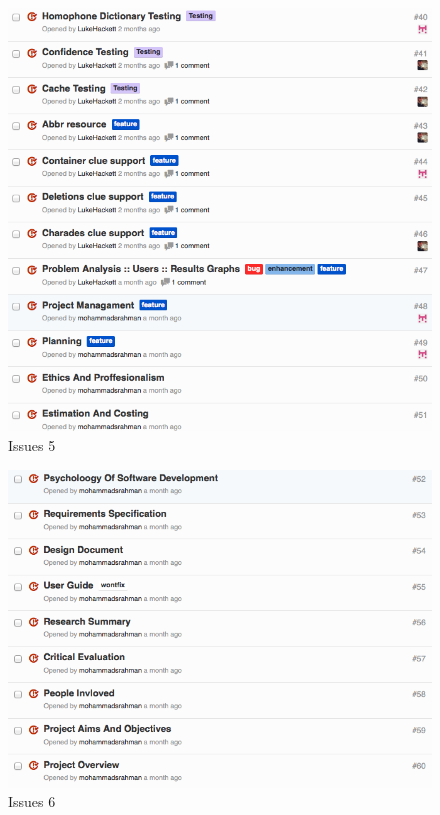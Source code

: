 \begin{figure}[H]
  \centering
  \includegraphics[width=\linewidth]{images/issues5.png}
  \caption{Issues 5}
  \label{fig:issues5}
\end{figure}

\begin{figure}[H]
  \centering
  \includegraphics[width=\linewidth]{images/issues6.png}
  \caption{Issues 6}
  \label{fig:issues6}
\end{figure}

